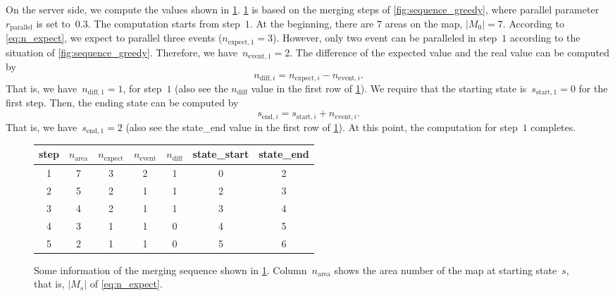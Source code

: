 \documentclass[ijgi,article,submit,moreauthors,pdftex]{Definitions/mdpi}
\begin{document}
On the server side, we compute the values shown in \tbl\ref{tbl:sequence_greedy}.
\tbl\ref{tbl:sequence_greedy} is based on the merging steps of
\fig\ref{fig:sequence_greedy},
where parallel parameter~$r_\mathrm{parallel}$ is set to~$0.3$.
The computation starts from step~$1$.
At the beginning, there are $7$ areas on the map, \ie$|M_0| = 7$.
According to \eq\ref{eq:n_expect},
we expect to parallel three events ($n_{\mathrm{expect},1} = 3$).
However, only two event can be paralleled in step~$1$ 
according to the situation of \fig\ref{fig:sequence_greedy}.
Therefore, we have~$n_{\mathrm{event},1} = 2$.
The difference of the expected value and the real value
can be computed by
\begin{equation}
\label{eq:n_diff}
n_{\mathrm{diff},i} = n_{\mathrm{expect},i} - n_{\mathrm{event},i}.
\end{equation}
That is, we have~$n_{\mathrm{diff},1}=1$, for step~$1$
(also see the $n_\mathrm{diff}$ value in the first row of \tbl\ref{tbl:sequence_greedy}).
We require that the starting state is~$s_{\mathrm{start},1} = 0$ for the first step.
Then, the ending state can be computed by
\begin{equation}
\label{eq:state_end}
s_{\mathrm{end},i} = s_{\mathrm{start},i} + n_{\mathrm{event},i}.
\end{equation}
That is, we have~$s_{\mathrm{end},1}=2$
(also see the state\_end value in the first row of \tbl\ref{tbl:sequence_greedy}).
At this point, the computation for step~$1$ completes.


\begin{figure}[tb]
%
%
%
\captionsetup*{type=table} %
\caption{Some information of the merging sequence shown in \tbl\ref{tbl:sequence_greedy}.
Column~$n_\mathrm{area}$ shows the area number of the map at starting state~$s$,
that is, $|M_s|$ of \eq\ref{eq:n_expect}.
}
\label{tbl:sequence_greedy}
\centering
\begin{tabular}{ccccccc}
	\hline
	step & $n_\mathrm{area}$ & $n_\mathrm{expect}$ 
	& $n_\mathrm{event}$ & $n_\mathrm{diff}$ & state\_start & state\_end \\ \hline
	1        & 7      & 3        & 2        & 1     & 0      & 2      \\
	2        & 5      & 2        & 1        & 1     & 2      & 3      \\
	3        & 4      & 2        & 1        & 1     & 3      & 4      \\
	4        & 3      & 1        & 1        & 0     & 4      & 5      \\
	5        & 2      & 1        & 1        & 0     & 5      & 6      \\ \hline
\end{tabular}
\end{figure}
\end{document}
